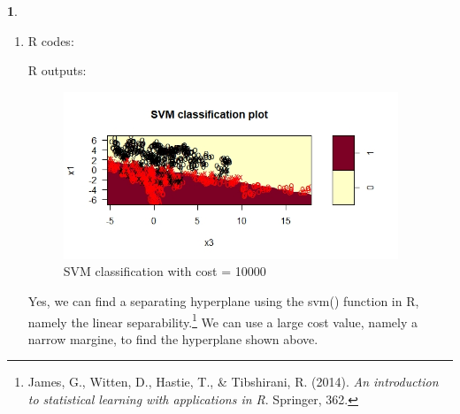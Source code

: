 \documentclass[10pt]{article}
\newtheorem{prob}{\bm{$Problem$}}
\begin{document}
\begin{prob}
\end{prob}
\begin{enumerate}[1)]
\vspace{3mm}

\item
R codes:

R outputs:
\begin{figure}[H]
  \centering
  \includegraphics[width=10cm,height=5cm]{p41a.jpeg}
  \caption{SVM classification with cost = 10000}
\end{figure}
Yes, we can find a separating hyperplane using the svm() function in R, namely the linear separability.\footnote{ James, G., Witten, D., Hastie, T., \& Tibshirani, R. (2014). \textit{An introduction to statistical learning with applications in R}. Springer, 362.} We can use a large cost value, namely a narrow margine, to find the hyperplane shown above. %
\vspace{3mm}


\end{enumerate}
\end{document}
